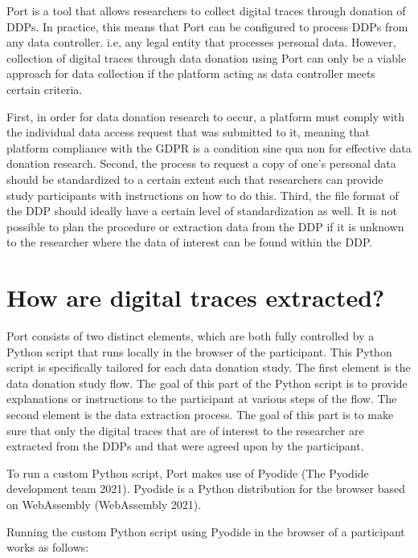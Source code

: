 \documentclass[
]{article}
\begin{document}
Port is a tool that allows researchers to collect digital traces through
donation of DDPs. In practice, this means that Port can be configured to
process DDPs from any data controller. i.e, any legal entity that
processes personal data. However, collection of digital traces through
data donation using Port can only be a viable approach for data
collection if the platform acting as data controller meets certain
criteria.

First, in order for data donation research to occur, a platform must
comply with the individual data access request that was submitted to it,
meaning that platform compliance with the GDPR is a condition sine qua
non for effective data donation research. Second, the process to request
a copy of one's personal data should be standardized to a certain extent
such that researchers can provide study participants with instructions
on how to do this. Third, the file format of the DDP should ideally have
a certain level of standardization as well. It is not possible to plan
the procedure or extraction data from the DDP if it is unknown to the
researcher where the data of interest can be found within the DDP.

\hypertarget{how-are-digital-traces-extracted}{%
\section{How are digital traces
extracted?}\label{how-are-digital-traces-extracted}}

Port consists of two distinct elements, which are both fully controlled
by a Python script that runs locally in the browser of the participant.
This Python script is specifically tailored for each data donation
study. The first element is the data donation study flow. The goal of
this part of the Python script is to provide explanations or
instructions to the participant at various steps of the flow. The second
element is the data extraction process. The goal of this part is to make
sure that only the digital traces that are of interest to the researcher
are extracted from the DDPs and that were agreed upon by the
participant.

To run a custom Python script, Port makes use of Pyodide (The Pyodide
development team 2021). Pyodide is a Python distribution for the browser
based on WebAssembly (WebAssembly 2021).

Running the custom Python script using Pyodide in the browser of a
participant works as follows:
\end{document}
